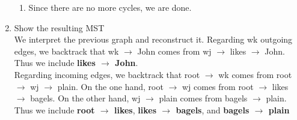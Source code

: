 \documentclass[12pt]{article}
\newenvironment{exercise}[2][Exercise]{\begin{trivlist}
\item[\hskip \labelsep {\bfseries #1}\hskip \labelsep {\bfseries #2.}]}{\end{trivlist}}
\begin{document}
\begin{exercise}{4}
\begin{enumerate}[label=(\alph*)]
\begin{enumerate}
\item Since there are no more cycles, we are done.

\end{enumerate}

\item Show the resulting MST \\

We interpret the previous graph and reconstruct it. Regarding wk outgoing edges, we backtrack that wk $\rightarrow$ John comes from wj $\rightarrow$ likes $\rightarrow$ John. Thus we include \textbf{likes $\rightarrow$ John}. \\

Regarding incoming edges, we backtrack that root $\rightarrow$ wk comes from root $\rightarrow$ wj $\rightarrow$ plain. On the one hand, root $\rightarrow$ wj comes from root $\rightarrow$ likes $\rightarrow$ bagels. 
On the other hand, wj $\rightarrow$ plain comes from bagels $\rightarrow$ plain. Thus we include \textbf{root $\rightarrow$ likes}, \textbf{likes $\rightarrow$ bagels}, and \textbf{bagels $\rightarrow$ plain}


\end{enumerate}
\end{exercise}
 
\end{document}
